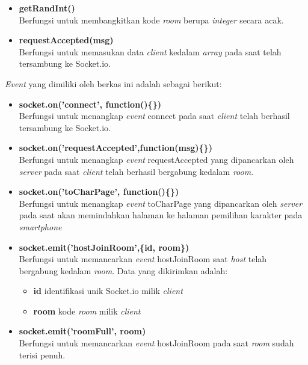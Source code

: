 \begin{enumerate}
\begin{enumerate}
\begin{enumerate}
\begin{itemize}
				\item \textbf{getRandInt()} \\
				Berfungsi untuk membangkitkan kode \textit{room} berupa \textit{integer} secara acak.
				
				\item \textbf{requestAccepted(msg)} \\
				Berfungsi untuk memasukan data \textit{client} kedalam \textit{array} pada saat telah tersambung ke Socket.io.
			\end{itemize}
			
			\textit{Event} yang dimiliki oleh berkas ini adalah sebagai berikut:
			\begin{itemize}
				\item \textbf{socket.on('connect', function()\{\})} \\
				Berfungsi untuk menangkap \textit{event} connect pada saat \textit{client} telah berhasil tersambung ke Socket.io.
				
				\item \textbf{socket.on('requestAccepted',function(msg)\{\})} \\
				Berfungsi untuk menangkap \textit{event} requestAccepted yang dipancarkan oleh \textit{server} pada saat \textit{client} telah berhasil bergabung kedalam \textit{room}.
				
				\item \textbf{socket.on('toCharPage', function()\{\})} \\
				Berfungsi untuk menangkap \textit{event} toCharPage yang dipancarkan oleh \textit{server} pada saat akan memindahkan halaman ke halaman pemilihan karakter pada \textit{smartphone}
				
				\item \textbf{socket.emit('hostJoinRoom',\{id, room\})} \\
				Berfungsi untuk memancarkan \textit{event} hostJoinRoom saat \textit{host} telah bergabung kedalam \textit{room}. Data yang dikirimkan adalah:
				\begin{itemize}
					\item \textbf{id} identifikasi unik Socket.io milik \textit{client}
					\item \textbf{room} kode \textit{room} milik \textit{client}
				\end{itemize}
			
				\item \textbf{socket.emit('roomFull', {room})} \\
				Berfungsi untuk memancarkan \textit{event} hostJoinRoom pada saat \textit{room} sudah terisi penuh.	
				

\end{itemize}
\end{enumerate}
\end{enumerate}
\end{enumerate}
